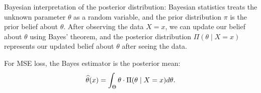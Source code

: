 \documentclass[11pt,letterpaper]{article}
\numberwithin{assumption}{lecture}
\numberwithin{theorem}{lecture}
\numberwithin{proposition}{lecture}
\numberwithin{lemma}{lecture}
\numberwithin{claim}{lecture}
\numberwithin{corollary}{lecture}
\numberwithin{definition}{lecture}
\numberwithin{conjecture}{lecture}
\numberwithin{remark}{lecture}
\numberwithin{example}{lecture}
\numberwithin{equation}{lecture}
\begin{document}
Bayesian interpretation of the posterior distribution: Bayesian statistics treats the unknown parameter $\theta$ as a random variable, and the prior distribution $\pi$ is the prior belief about $\theta$. After observing the data $X = x$, we can update our belief about $\theta$ using Bayes' theorem, and the posterior distribution $\Pi (\theta \mid X = x)$ represents our updated belief about $\theta$ after seeing the data.

For MSE loss, the Bayes estimator is the posterior mean:
\begin{align*}
  \widehat{\theta} (x) = \int_\Theta \theta \cdot  \Pi (\theta \mid X = x) d\theta.
\end{align*}
\end{document}
